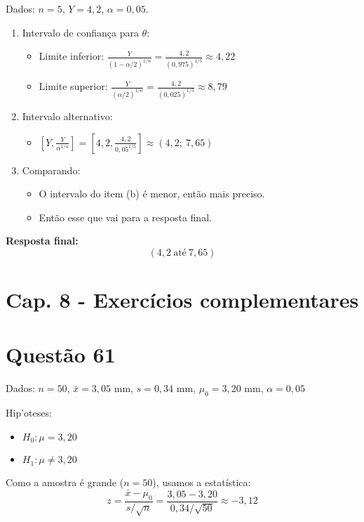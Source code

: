 \documentclass[12pt]{article}
\newcommand{\quest}[1]{\section*{Questão #1}} %
\begin{document}
Dados: $n = 5$, $Y = 4{,}2$, $\alpha = 0{,}05$.

\begin{enumerate}
    \item Intervalo de confiança para $\theta$:
    \begin{itemize}
        \item Limite inferior: $\displaystyle \frac{Y}{(1 - \alpha/2)^{1/n}} = \frac{4{,}2}{(0{,}975)^{1/5}} \approx 4{,}22$
        \item Limite superior: $\displaystyle \frac{Y}{(\alpha/2)^{1/n}} = \frac{4{,}2}{(0{,}025)^{1/5}} \approx 8{,}79$
    \end{itemize}

    \item Intervalo alternativo:
    \begin{itemize}
        \item $\left[ Y, \frac{Y}{\alpha^{1/n}} \right] = \left[ 4{,}2, \frac{4{,}2}{0{,}05^{1/5}} \right] \approx (4{,}2;\ 7{,}65)$
    \end{itemize}

    \item Comparando:
    \begin{itemize}
        \item O intervalo do item (b) é menor, então mais preciso.
        \item Então esse que vai para a resposta final.
    \end{itemize}
\end{enumerate}

\textbf{Resposta final:}
\[
\boxed{(4{,}2\ \text{até}\ 7{,}65)}
\]

\section{Cap. 8 - Exercícios complementares}


\quest{61}

Dados: $n = 50$, $\bar{x} = 3{,}05$ mm, $s = 0{,}34$ mm, $\mu_0 = 3{,}20$ mm, $\alpha = 0{,}05$

Hip'oteses:
\begin{itemize}
  \item $H_0: \mu = 3{,}20$
  \item $H_1: \mu \neq 3{,}20$
\end{itemize}

Como a amostra \'{e} grande ($n = 50$), usamos a estat\'istica:
\[
z = \frac{\bar{x} - \mu_0}{s / \sqrt{n}} = \frac{3{,}05 - 3{,}20}{0{,}34 / \sqrt{50}} \approx -3{,}12
\]
\end{document}
